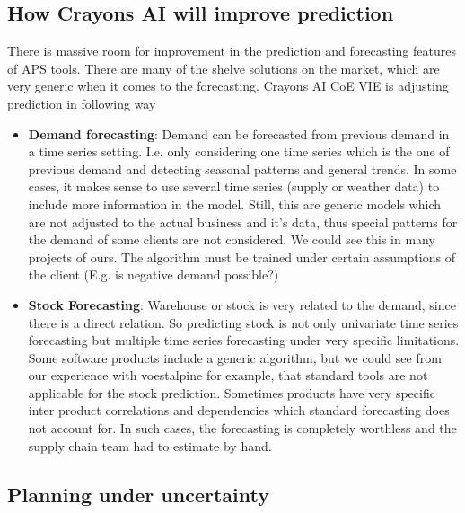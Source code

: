 \documentclass[fleqn,10pt]{SelfArx} %
\begin{document}
\subsection{How Crayons AI will improve prediction} 
There is massive room for improvement in the prediction and forecasting features of APS tools. There are many of the shelve solutions on the market, which are very generic when it comes to the forecasting. Crayons AI CoE VIE is adjusting prediction in following way
\begin{itemize}
  \item \textbf{Demand forecasting}: Demand can be forecasted from previous demand in a time series setting. I.e. only considering one time series which is the one of previous demand and detecting seasonal patterns and general trends. In some cases, it makes sense to use several time series (supply or weather data) to include more information in the model. Still, this are generic models which are not adjusted to the actual business and it’s data, thus special patterns for the demand of some clients are not considered. We could see this in many projects of ours. The algorithm must be trained under certain assumptions of the client (E.g. is negative demand possible?)
  \item	\textbf{Stock Forecasting}: Warehouse or stock is very related to the demand, since there is a direct relation. So predicting stock is not only univariate time series forecasting but multiple time series forecasting under very specific limitations. Some software products include a generic algorithm, but we could see from our experience with voestalpine for example, that standard tools are not applicable for the stock prediction. Sometimes products have very specific inter product correlations and dependencies which standard forecasting does not account for. In such cases, the forecasting is completely worthless and the supply chain team had to estimate by hand. 
\end{itemize}


\subsection{Planning under uncertainty}
\end{document}
